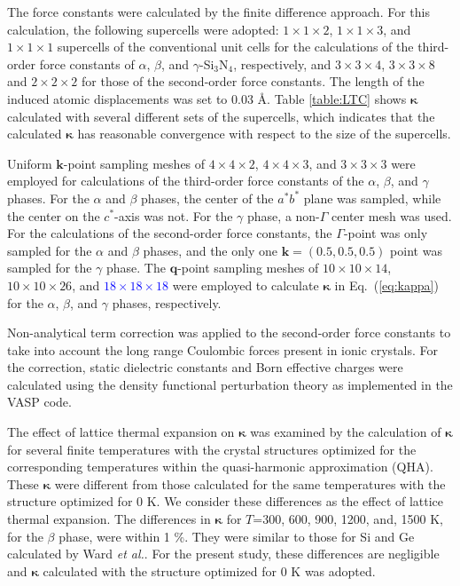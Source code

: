 \documentclass[twocolumn,amsmath,amssymb,a4paper,prb,superscriptaddress,floatfix]{revtex4-1}
\begin{document}
The force constants were calculated by the finite difference
approach\cite{wei-supercell}. For this calculation, the following supercells
were adopted: $1\times 1\times2$, $1\times 1\times3$, and $1\times 1\times1$
supercells of the conventional unit cells for the calculations of the
third-order force constants of $\alpha$, $\beta$, and $\gamma$-Si$_3$N$_4$,
respectively, and $3\times 3\times4$, $3\times 3\times8$ and $2\times 2\times2$
for those of the second-order force constants.  The length of the induced atomic
displacements was set to 0.03 \AA.  Table \ref{table:LTC} shows
$\boldsymbol{\kappa}$ calculated with several different sets of the supercells,
which indicates that the calculated $\boldsymbol{\kappa}$ has reasonable
convergence with respect to the size of the supercells.

Uniform $\mathbf{k}$-point sampling meshes of $4\times 4\times 2$, $4\times
4\times 3$, and $3\times 3\times 3$ were employed for calculations of the
third-order force constants of the $\alpha$, $\beta$, and $\gamma$ phases. For
the $\alpha$ and $\beta$ phases, the center of the $a^*b^*$ plane was sampled,
while the center on the $c^*$-axis was not. For the $\gamma$ phase, a non-$\Gamma$
center mesh was used. For the calculations of the second-order force constants,
the $\Gamma$-point was only sampled for the $\alpha$ and $\beta$
phases, and the
only one $\mathbf{k}=(0.5, 0.5, 0.5)$ point was sampled for the $\gamma$ phase.
The $\mathbf{q}$-point sampling meshes of $10\times 10\times 14$, $10\times
10\times 26$, and \textcolor{blue}{$18\times 18\times 18$} were employed to calculate
$\boldsymbol{\kappa}$ in Eq.~(\ref{eq:kappa}) for the $\alpha$, $\beta$, and
$\gamma$ phases, respectively.

Non-analytical term correction\cite{wang} was applied to the second-order force
constants to take into account the long range Coulombic forces present in ionic
crystals. For the correction, static dielectric constants and Born effective
charges were calculated using the density functional perturbation theory
as implemented in the VASP code\cite{vasp-lepsiron,lepsiron}.

The effect of lattice thermal expansion on $\boldsymbol{\kappa}$ was examined
by the calculation of $\boldsymbol{\kappa}$ for several finite
temperatures with the crystal structures optimized for the
corresponding temperatures within the quasi-harmonic approximation
(QHA)\cite{dove-p76}. These $\boldsymbol{\kappa}$ were different from those
calculated for the same temperatures with the structure
optimized for 0 K. We consider these differences as the effect of lattice
thermal expansion. The differences in $\boldsymbol{\kappa}$ for $T$=300, 600,
900, 1200, and, 1500 K, for the $\beta$ phase, were within 1 \%. They
were similar to those for Si and Ge calculated by Ward {\it{et
al.}}\cite{ward-ltc}.
For the present study, these differences are negligible and
$\boldsymbol{\kappa}$ calculated with the
structure optimized for 0 K was adopted.
\end{document}
